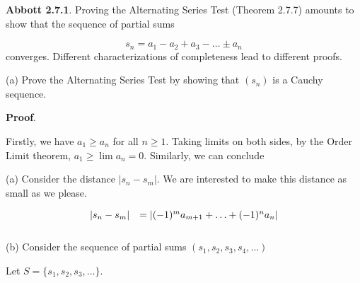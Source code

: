 \documentclass[10pt]{article}
\begin{document}
\textbf{Abbott 2.7.1}. Proving the Alternating Series Test (Theorem 2.7.7) amounts to show that the sequence of partial sums 


\begin{equation*}
s_{n} =a_{1} -a_{2} +a_{3} -\dotsc \pm a_{n}
\end{equation*}
converges. Different characterizations of completeness lead to different proofs.



(a) Prove the Alternating Series Test by showing that $\displaystyle ( s_{n})$ is a Cauchy sequence.



\textbf{Proof}.



Firstly, we have $\displaystyle a_{1} \geq a_{n}$ for all $\displaystyle n\geq 1$. Taking limits on both sides, by the Order Limit theorem, $\displaystyle a_{1} \geq \lim a_{n} =0$. Similarly, we can conclude 



(a) Consider the distance $\displaystyle |s_{n} -s_{m} |$. We are interested to make this distance as small as we please.




\begin{equation*}
\begin{array}{ c l }
|s_{n} -s_{m} | & =|( -1)^{m} a_{m+1} +\dotsc +( -1)^{n} a_{n} |\\
 & 
\end{array}
\end{equation*}
(b) Consider the sequence of partial sums $\displaystyle ( s_{1} ,s_{2} ,s_{3} ,s_{4} ,\dotsc )$



Let $\displaystyle S=\{s_{1} ,s_{2} ,s_{3} ,\dotsc \}$.




\end{document}
